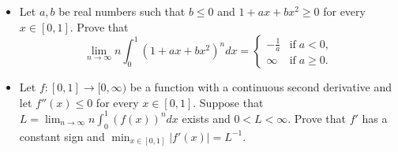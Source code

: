 \begin{itemize}
    \item[(a)] Let \(a,b\) be real numbers such that \(b\leq 0\) and \(1+ax+bx^{2} \geq 0\) for every \(x\in [0,1]\).
    Prove that
    \[\lim_{n\to \infty} n \int_{0}^{1}(1+ax+bx^{2})^{n}dx= \begin{cases}
    -\frac{1}{a} &\text{if}\; a<0,\\
    \infty & \text{if}\; a \geq 0.
    \end{cases}\]
    \item[(b)] Let \(f\colon [0,1]\rightarrow[0,\infty)\) be a function with a continuous second derivative and let \(f''(x)\leq0\) for every \(x\in [0,1]\). Suppose that \(L=\lim_{n\to \infty} n \int_{0}^{1}(f(x))^{n}dx\) exists and \(0<L<\infty\). Prove that \(f'\) has a constant sign and  \(\min_{x\in [0,1]}|f'(x)|=L^{-1}\).
\end{itemize}